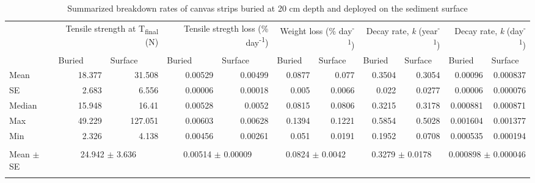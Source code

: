 \begin{table}[htbp]\small \centering
  \centering
  \caption{Summarized breakdown rates of canvas strips buried at 20 cm depth and deployed on the sediment surface}
    \begin{tabular}{lrrrrrrrrrr}
      \hline\noalign{\smallskip}
          & \multicolumn{2}{p{8em}}{\centering Tensile strength at T\textsubscript{final} (N)}     & \multicolumn{2}{p{8em}}{\centering Tensile stregth loss (\% day\textsuperscript{-1})} & \multicolumn{2}{p{6em}}{\centering Weight loss (\% day\textsuperscript{-1})} & \multicolumn{2}{p{7em}}{\centering Decay rate, \textit{k} (year\textsuperscript{-1})} & \multicolumn{2}{p{7em}}{\centering Decay rate, \textit{k} (day\textsuperscript{-1})} \\


          & \multicolumn{1}{l}{Buried} & \multicolumn{1}{l}{Surface} & \multicolumn{1}{l}{Buried} & \multicolumn{1}{l}{\centering Surface} & \multicolumn{1}{l}{Buried} & \multicolumn{1}{l}{Surface} & \multicolumn{1}{l}{Buried} & \multicolumn{1}{l}{Surface} & \multicolumn{1}{l}{Buried} & \multicolumn{1}{l}{Surface} \\

              \noalign{\smallskip}\hline\noalign{\smallskip}
              
    Mean & 18.377 & 31.508 & 0.00529 & 0.00499 & 0.0877 & 0.077 & 0.3504 & 0.3054 & 0.00096 & 0.000837 \\
    SE    & 2.683 & 6.556 & 0.00006 & 0.00018 & 0.005 & 0.0066 & 0.022 & 0.0277 & 0.00006 & 0.000076 \\
    Median & 15.948 & 16.41 & 0.00528 & 0.0052 & 0.0815 & 0.0806 & 0.3215 & 0.3178 & 0.000881 & 0.000871 \\
    Max   & 49.229 & 127.051 & 0.00603 & 0.00628 & 0.1394 & 0.1221 & 0.5854 & 0.5028 & 0.001604 & 0.001377 \\
    Min   & 2.326 & 4.138 & 0.00456 & 0.00261 & 0.051 & 0.0191 & 0.1952 & 0.0708 & 0.000535 & 0.000194 \\

\noalign{\bigskip}

\multicolumn{2}{c}{\multirow{1}[1]{*}{All sites}} &  &  & &  &  &  &  &  &  \\

    \multicolumn{1}{l}{{Mean $\pm$ SE}} & \multicolumn{2}{c}{24.942 $\pm$ 3.636} &      \multicolumn{2}{c}{0.00514 $\pm$ 0.00009} &        \multicolumn{2}{c}{0.0824 $\pm$ 0.0042} &          \multicolumn{2}{c}{0.3279 $\pm$ 0.0178} &        \multicolumn{2}{c}{0.000898 $\pm$ 0.000046} \\





        \noalign{\smallskip}\hline
    \end{tabular}%
  \label{tab:addlabel}%
\end{table}%


